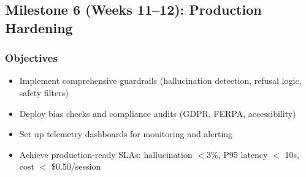 \documentclass[11pt,letterpaper]{article}
\begin{document}
\subsection{Milestone 6 (Weeks 11--12): Production Hardening}

\subsubsection{Objectives}
\begin{itemize}
\item Implement comprehensive guardrails (hallucination detection, refusal logic, safety filters)
\item Deploy bias checks and compliance audits (GDPR, FERPA, accessibility)
\item Set up telemetry dashboards for monitoring and alerting
\item Achieve production-ready SLAs: hallucination $< 3\%$, P95 latency $<$ 10s, cost $<$ \$0.50/session
\end{itemize}
\end{document}
